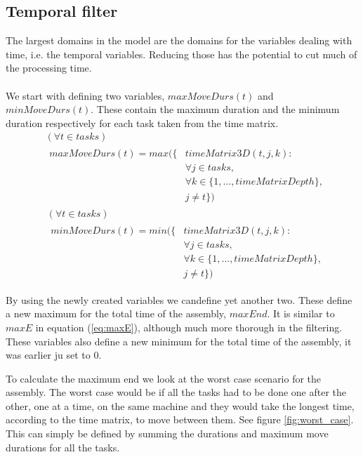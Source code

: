 \subsection{Temporal filter}
  The largest domains in the model are the domains for the variables dealing with time, i.e. the temporal variables. Reducing those has the potential to cut much of the processing time.
  \\\\
   We start with defining two variables, $maxMoveDurs(t)$ and $minMoveDurs(t)$. These contain the maximum duration and the minimum duration respectively for each task taken from the time matrix.
  \begin{equation}
  \begin{aligned}\label{eq:57}
  &( \forall t \in tasks)\\
  &\begin{aligned}
  maxMoveDurs(t) = max(\{&timeMatrix3D(t,j,k) :\\
  &\forall j \in tasks, \\
  &\forall k \in \{1 , \ldots , timeMatrixDepth\},\\
  &j \neq t\})
  \end{aligned}
  \end{aligned}
  \end{equation}
   \begin{equation}
   \begin{aligned}\label{eq:58}
   &(\forall t \in tasks)\\
   &\begin{aligned}
   minMoveDurs(t) = min(\{&timeMatrix3D(t,j,k) :\\
   &\forall j \in tasks, \\
   &\forall k \in \{1 , \ldots , timeMatrixDepth\},\\
   &j \neq t\})
   \end{aligned}
   \end{aligned}
   \end{equation}

  \noindent By using the newly created variables we candefine yet another two. These define a new maximum for the total time of the assembly, $maxEnd$. It is similar to $maxE$ in equation (\ref{eq:maxE}), although much more thorough in the filtering. These variables also define a new minimum for the total time of the assembly, it was earlier ju set to 0.
   
   To calculate the maximum end we look at the worst case scenario for the assembly. The worst case would be if all the tasks had to be done one after the other, one at a time, on the same machine and they would take the longest time, according to the time matrix, to move between them. See figure \ref{fig:worst_case}. This can simply be defined by summing the durations and maximum move durations for all the tasks.
   
